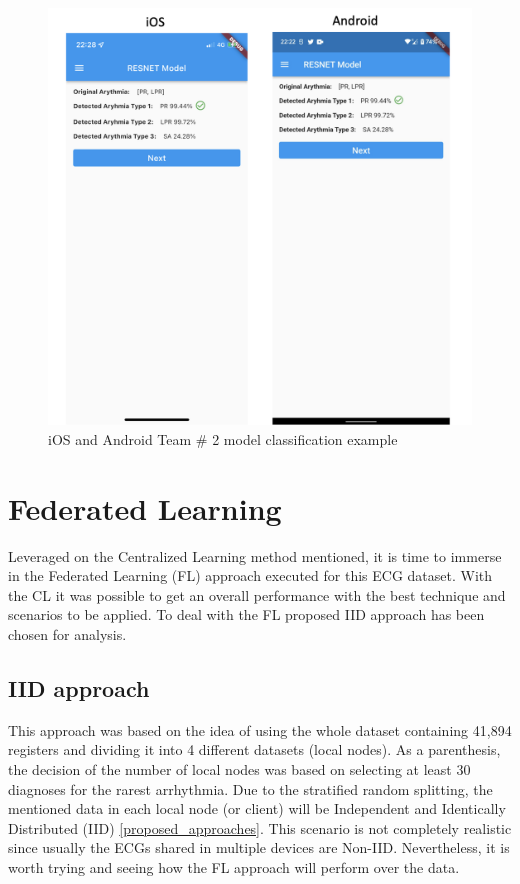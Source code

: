 \begin{figure}[H]
\centering
\includegraphics[scale=0.4]{img/resnet_deployment.png}
\caption{iOS and Android Team \# 2 model classification example}
\label{dnn_deloyment}
\end{figure}




\section{Federated Learning} \label{5FL}

Leveraged on the Centralized Learning method mentioned, it is time to immerse in the Federated Learning (FL) approach executed for this ECG dataset. With the CL it was possible to get an overall performance with the best technique and scenarios to be applied. To deal with the FL proposed IID approach has been chosen for analysis. 

\subsection{IID approach}

This approach was based on the idea of using the whole dataset containing 41,894 registers and dividing it into 4 different datasets (local nodes). As a parenthesis, the decision of the number of local nodes was based on selecting at least 30 diagnoses for the rarest arrhythmia. Due to the stratified random splitting, the mentioned data in each local node (or client) will be Independent and Identically Distributed (IID) \ref{proposed_approaches}. This scenario is not completely realistic since usually the ECGs shared in multiple devices are Non-IID. Nevertheless, it is worth trying and seeing how the FL approach will perform over the data.

